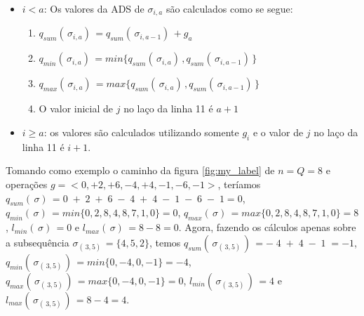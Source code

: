    \begin{itemize}
        \item $i < a$: Os valores da ADS de $\sigma_{i, a}$ são calculados como se segue:
        \begin{enumerate}
            \item $q_{sum}(\,\sigma_{i, a})\, = q_{sum}(\,\sigma_{i, a-1})\, + g_a$
            \item $q_{min}(\,\sigma_{i, a})\, = min\{q_{sum}(\,\sigma_{i, a})\,, q_{sum}(\,\sigma_{i, a-1})\,\}$
            \item $q_{max}(\,\sigma_{i, a})\, = max\{q_{sum}(\,\sigma_{i, a})\,, q_{sum}(\,\sigma_{i, a-1})\,\}$
            \item O valor inicial de $j$ no laço da linha 11 é $a + 1$
        \end{enumerate}
        \item $i \geq a$: os valores são calculados utilizando somente $g_i$ e o valor de $j$ no laço da linha 11 é $i + 1$.
    \end{itemize}
    
\par Tomando como exemplo o caminho da figura \ref{fig:my_label} de $n = Q = 8$ e operações \( g = <0, +2, +6, -4, +4, -1, -6, -1>\), teríamos $q_{sum}(\,\sigma)\, = 0\; +\; 2\; +\; 6\; -\; 4\; +\; 4\; -\; 1\; -\; 6\; -\; 1 = 0$, $q_{min}(\,\sigma)\, = min\{0, 2, 8, 4, 8, 7, 1, 0\} = 0$, $q_{max}(\,\sigma)\, = max\{0, 2, 8, 4, 8, 7, 1, 0\} = 8$, $l_{min}(\,\sigma)\, = 0$ e $l_{max}(\,\sigma)\, = 8 - 8 = 0$. Agora, fazendo os cálculos apenas sobre a subsequência $\sigma_{(\,3, 5)\,} = \{4, 5, 2\}$, temos $q_{sum}(\,\sigma_{(\,3, 5)\,})\, = -\; 4\; +\; 4\; -\; 1\; = -1$, $q_{min}(\,\sigma_{(\,3, 5)\,})\, = min\{0, -4, 0, -1\} = -4$, $q_{max}(\,\sigma_{(\,3, 5)\,})\, = max\{0, -4, 0, -1\} = 0$, $l_{min}(\,\sigma_{(\,3, 5)\,})\, = 4$ e $l_{max}(\,\sigma_{(\,3, 5)\,})\, = 8 - 4 = 4$.

